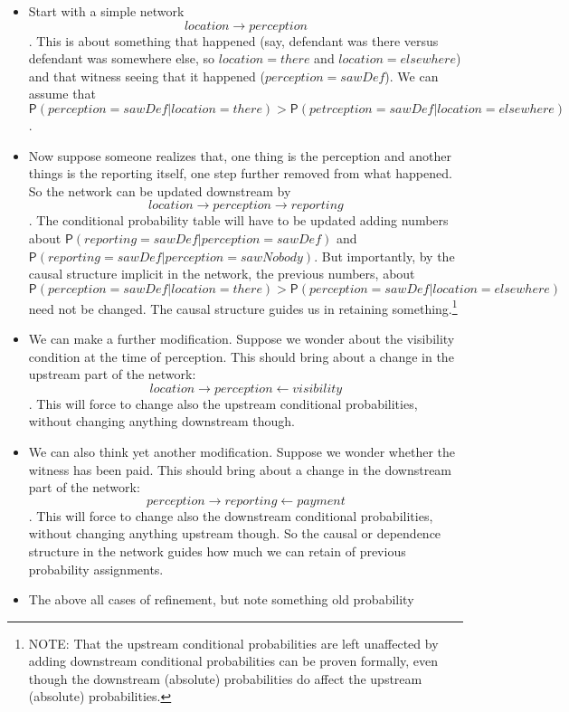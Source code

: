 \documentclass[
  11pt,
  dvipsnames,enabledeprecatedfontcommands]{scrartcl}
\newcommand{\pr}[1]{\ensuremath{\mathsf{P}(#1)}}
\begin{document}
\begin{itemize}
\item
  Start with a simple network\[location\rightarrow perception\]. This is
  about something that happened (say, defendant was there versus
  defendant was somewhere else, so \(location=there\) and
  \(location=elsewhere\)) and that witness seeing that it happened
  (\(perception=sawDef\)). We can assume that
  \[\pr{perception=sawDef \vert location=there}>\pr{petrception=sawDef \vert location=elsewhere}\].
\item
  Now suppose someone realizes that, one thing is the perception and
  another things is the reporting itself, one step further removed from
  what happened. So the network can be updated downstream by
  \[location\rightarrow perception \rightarrow reporting\]. The
  conditional probability table will have to be updated adding numbers
  about \(\pr{reporting=sawDef \vert perception=sawDef}\) and
  \(\pr{reporting=sawDef \vert perception=sawNobody}\). But importantly,
  by the causal structure implicit in the network, the previous numbers,
  about
  \[\pr{perception=sawDef \vert location=there}>\pr{perception=sawDef \vert location=elsewhere}\]
  need not be changed. The causal structure guides us in retaining
  something.\footnote{NOTE: That the upstream conditional probabilities
    are left unaffected by adding downstream conditional probabilities
    can be proven formally, even though the downstream (absolute)
    probabilities do affect the upstream (absolute) probabilities.}
\item
  We can make a further modification. Suppose we wonder about the
  visibility condition at the time of perception. This should bring
  about a change in the upstream part of the network:
  \[location\rightarrow perception \leftarrow visibility\]. This will
  force to change also the upstream conditional probabilities, without
  changing anything downstream though.
\item
  We can also think yet another modification. Suppose we wonder whether
  the witness has been paid. This should bring about a change in the
  downstream part of the network:
  \[perception\rightarrow reporting \leftarrow payment\]. This will
  force to change also the downstream conditional probabilities, without
  changing anything upstream though. So the causal or dependence
  structure in the network guides how much we can retain of previous
  probability assignments.
\item
  The above all cases of refinement, but note something old probability

\end{itemize}
\end{document}
